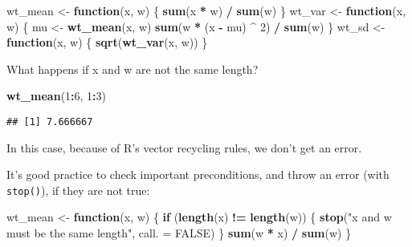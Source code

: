 \documentclass[
]{article}
\newenvironment{Shaded}{\begin{snugshade}}{\end{snugshade}}
\newcommand{\AttributeTok}[1]{\textcolor[rgb]{0.13,0.29,0.53}{#1}}
\newcommand{\ConstantTok}[1]{\textcolor[rgb]{0.56,0.35,0.01}{#1}}
\newcommand{\ControlFlowTok}[1]{\textcolor[rgb]{0.13,0.29,0.53}{\textbf{#1}}}
\newcommand{\DecValTok}[1]{\textcolor[rgb]{0.00,0.00,0.81}{#1}}
\newcommand{\FunctionTok}[1]{\textcolor[rgb]{0.13,0.29,0.53}{\textbf{#1}}}
\newcommand{\NormalTok}[1]{#1}
\newcommand{\OtherTok}[1]{\textcolor[rgb]{0.56,0.35,0.01}{#1}}
\newcommand{\SpecialCharTok}[1]{\textcolor[rgb]{0.81,0.36,0.00}{\textbf{#1}}}
\newcommand{\StringTok}[1]{\textcolor[rgb]{0.31,0.60,0.02}{#1}}
\begin{document}
\begin{Shaded}
\begin{Highlighting}[]
\NormalTok{wt\_mean }\OtherTok{\textless{}{-}} \ControlFlowTok{function}\NormalTok{(x, w) \{}
  \FunctionTok{sum}\NormalTok{(x }\SpecialCharTok{*}\NormalTok{ w) }\SpecialCharTok{/} \FunctionTok{sum}\NormalTok{(w)}
\NormalTok{\}}
\NormalTok{wt\_var }\OtherTok{\textless{}{-}} \ControlFlowTok{function}\NormalTok{(x, w) \{}
\NormalTok{  mu }\OtherTok{\textless{}{-}} \FunctionTok{wt\_mean}\NormalTok{(x, w)}
  \FunctionTok{sum}\NormalTok{(w }\SpecialCharTok{*}\NormalTok{ (x }\SpecialCharTok{{-}}\NormalTok{ mu) }\SpecialCharTok{\^{}} \DecValTok{2}\NormalTok{) }\SpecialCharTok{/} \FunctionTok{sum}\NormalTok{(w)}
\NormalTok{\}}
\NormalTok{wt\_sd }\OtherTok{\textless{}{-}} \ControlFlowTok{function}\NormalTok{(x, w) \{}
  \FunctionTok{sqrt}\NormalTok{(}\FunctionTok{wt\_var}\NormalTok{(x, w))}
\NormalTok{\}}
\end{Highlighting}
\end{Shaded}

What happens if x and w are not the same length?

\begin{Shaded}
\begin{Highlighting}[]
\FunctionTok{wt\_mean}\NormalTok{(}\DecValTok{1}\SpecialCharTok{:}\DecValTok{6}\NormalTok{, }\DecValTok{1}\SpecialCharTok{:}\DecValTok{3}\NormalTok{)}
\end{Highlighting}
\end{Shaded}

\begin{verbatim}
## [1] 7.666667
\end{verbatim}

In this case, because of R's vector recycling rules, we don't get an
error.

It's good practice to check important preconditions, and throw an error
(with \texttt{stop()}), if they are not true:

\begin{Shaded}
\begin{Highlighting}[]
\NormalTok{wt\_mean }\OtherTok{\textless{}{-}} \ControlFlowTok{function}\NormalTok{(x, w) \{}
  \ControlFlowTok{if}\NormalTok{ (}\FunctionTok{length}\NormalTok{(x) }\SpecialCharTok{!=} \FunctionTok{length}\NormalTok{(w)) \{}
    \FunctionTok{stop}\NormalTok{(}\StringTok{"\textasciigrave{}x\textasciigrave{} and \textasciigrave{}w\textasciigrave{} must be the same length"}\NormalTok{, }\AttributeTok{call. =} \ConstantTok{FALSE}\NormalTok{)}
\NormalTok{  \}}
  \FunctionTok{sum}\NormalTok{(w }\SpecialCharTok{*}\NormalTok{ x) }\SpecialCharTok{/} \FunctionTok{sum}\NormalTok{(w)}
\NormalTok{\}}
\end{Highlighting}
\end{Shaded}
\end{document}
